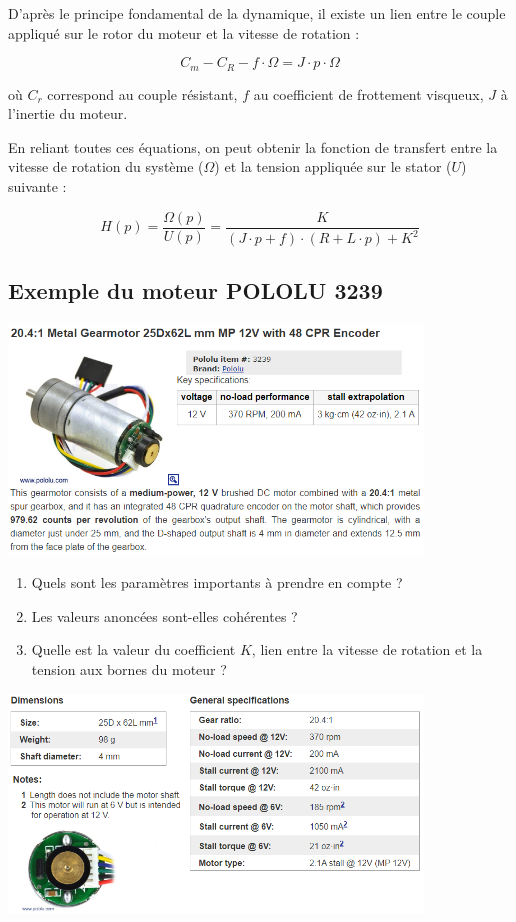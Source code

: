 \documentclass[10pt]{article} %
\begin{document}
D'après le principe fondamental de la dynamique, il existe un lien entre le couple appliqué sur le rotor du moteur et la vitesse de rotation :

$$C_m - C_R - f \cdot \Omega = J \cdot p \cdot \Omega$$

où $C_r$ correspond au couple résistant, $f$ au coefficient de frottement visqueux, $J$ à l'inertie du moteur. 

En reliant toutes ces équations, on peut obtenir la fonction de transfert entre la vitesse de rotation du système ($\Omega$) et la tension appliquée sur le stator ($U$) suivante : 

$$H(p) = \frac{\Omega(p)}{U(p)} = \frac{K}{(J \cdot p + f) \cdot (R + L \cdot p) + K^2}$$


\subsection*{Exemple du moteur POLOLU 3239}

\begin{center}
	\includegraphics[width=11cm]{images/POL3239_2.png}
\end{center}

\begin{enumerate}
	\item Quels sont les paramètres importants à prendre en compte ?
	\item Les valeurs anoncées sont-elles cohérentes ?

	\item Quelle est la valeur du coefficient $K$, lien entre la vitesse de rotation et la tension aux bornes du moteur ?	
\end{enumerate}

\begin{center}
	\includegraphics[width=11cm]{images/POL3239_1.png}
\end{center}
\end{document}
